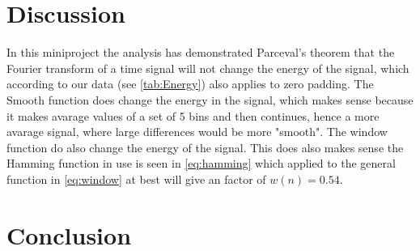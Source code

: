 \section{Discussion}

In this miniproject the analysis has demonstrated Parceval's theorem that the Fourier transform of a time signal will not change the energy of the signal, which according to our data (see \cref{tab:Energy}) also applies to zero padding. The Smooth function does change the energy in the signal, which makes sense because it makes avarage values of a set of 5 bins and then continues, hence a more avarage signal, where large differences would be more "smooth". The window function do also change the energy of the signal. This does also makes sense the Hamming function in use is seen in \cref{eq:hamming} which applied to the general function in \cref{eq:window} at best will give an factor of $w(n)=0.54$.

\section{Conclusion}

